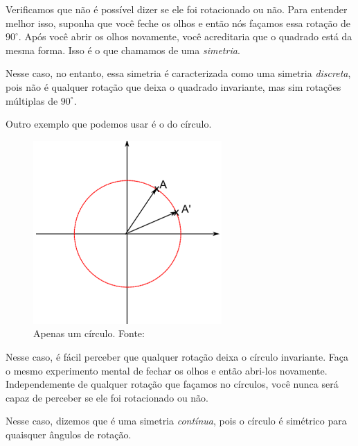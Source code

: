 \documentclass{article}
\numberwithin{equation}{section}
\numberwithin{figure}{section}
\begin{document}
Verificamos que não é possível dizer se ele foi rotacionado ou não. Para entender melhor isso, suponha que você feche os olhos e então nós façamos essa rotação de $90^{\circ}$. Após você abrir os olhos novamente, você acreditaria que o quadrado está da mesma forma. Isso é o que chamamos de uma \textit{simetria}. 

Nesse caso, no entanto, essa simetria é caracterizada como uma simetria \textit{discreta}, pois não é qualquer rotação que deixa o quadrado invariante, mas sim rotações múltiplas de $90^{\circ}$. 

Outro exemplo que podemos usar é o do círculo. 
\begin{figure}[H]
	\centering
	\includegraphics[scale=0.5]{figures/circ.png}
	\caption{Apenas um círculo. Fonte: \cite{jakob}}
\end{figure}
Nesse caso, é fácil perceber que qualquer rotação deixa o círculo invariante. Faça o mesmo experimento mental de fechar os olhos e então abri-los novamente. Independemente de qualquer rotação que façamos no círculos, você nunca será capaz de perceber se ele foi rotacionado ou não. 

Nesse caso, dizemos que é uma simetria \textit{contínua}, pois o círculo é simétrico para quaisquer ângulos de rotação. 
\end{document}
